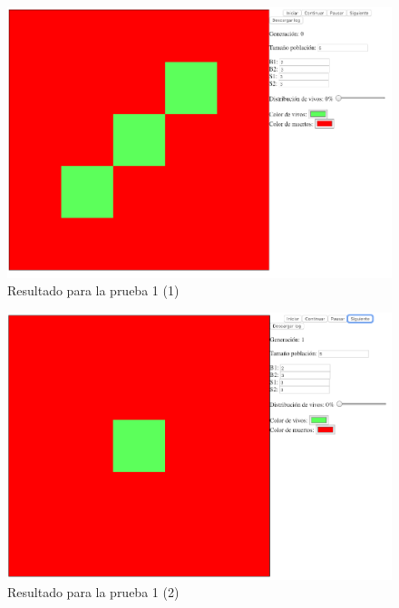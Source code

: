 	\begin{figure}[H]
		\begin{center}
			\includegraphics[scale=.3]{GOL/img/test1-1.png}
			\caption{Resultado para la prueba 1 (1)}
			\label{fig:gol3}
		\end{center}
	\end{figure}

	\begin{figure}[H]
		\begin{center}
			\includegraphics[scale=.3]{GOL/img/test1-2.png}
			\caption{Resultado para la prueba 1 (2)}
			\label{fig:gol4}
		\end{center}
	\end{figure}

